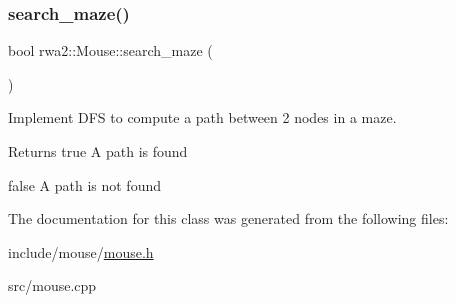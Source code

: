 \subsubsection{\texorpdfstring{search\+\_\+maze()}{search\_maze()}}
{\footnotesize\ttfamily bool rwa2\+::\+Mouse\+::search\+\_\+maze (\begin{DoxyParamCaption}{ }\end{DoxyParamCaption})}



Implement D\+FS to compute a path between 2 nodes in a maze. 

\begin{DoxyReturn}{Returns}
true A path is found 

false A path is not found 
\end{DoxyReturn}


The documentation for this class was generated from the following files\+:\begin{DoxyCompactItemize}
\item 
include/mouse/\hyperlink{mouse_8h}{mouse.\+h}\item 
src/mouse.\+cpp\end{DoxyCompactItemize}
